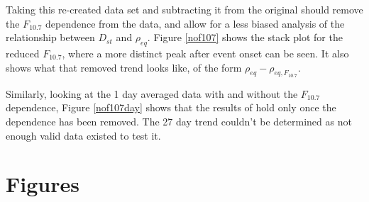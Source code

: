 \documentclass[10pt,twocolumn]{article}
\begin{document}
Taking this re-created data set and subtracting it from the original should remove the $F_{10.7}$ dependence from the data, and allow for a less biased analysis of the relationship between $D_{st}$ and $\rho_{eq}$. Figure \ref{nof107} shows the stack plot for the reduced $F_{10.7}$, where a more distinct peak after event onset can be seen. It also shows what that removed trend looks like, of the form $\rho_{eq}-\rho_{eq,F_{10.7}}$.



Similarly, looking at the 1 day averaged data with and without the $F_{10.7}$ dependence, Figure \ref{nof107day} shows that the results of \cite{Takahashi2010} hold only once the dependence has been removed. The 27 day trend couldn't be determined as not enough valid data existed to test it.



\newpage
\footnotesize




\section{Figures}
\end{document}
